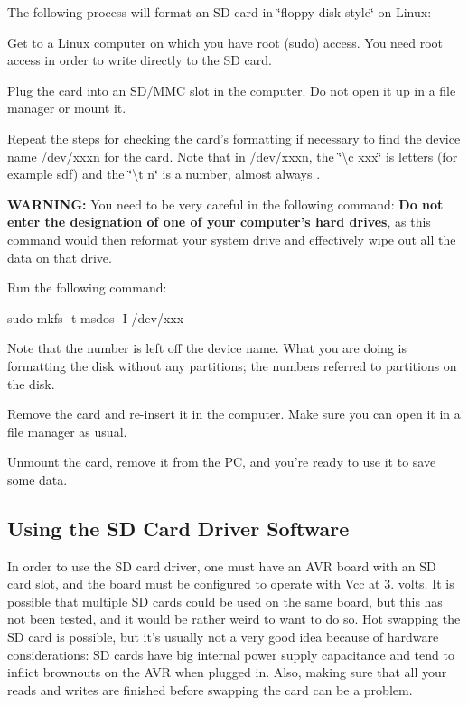 The following process will format an S\-D card in \char`\"{}floppy disk style\char`\"{} on Linux\-: \begin{DoxyItemize}
\item Get to a Linux computer on which you have root (sudo) access. You need root access in order to write directly to the S\-D card. \item Plug the card into an S\-D/\-M\-M\-C slot in the computer. Do not open it up in a file manager or mount it. \item Repeat the steps for checking the card's formatting if necessary to find the device name {\ttfamily /dev/xxxn} for the card. Note that in {\ttfamily /dev/xxxn}, the \char`\"{}\textbackslash{}c xxx\char`\"{} is letters (for example sdf) and the \char`\"{}\textbackslash{}t n\char`\"{} is a number, almost always {}. \item {\bfseries W\-A\-R\-N\-I\-N\-G\-:} You need to be very careful in the following command\-: {\bfseries Do not enter the designation of one of your computer's hard drives}, as this command would then reformat your system drive and effectively wipe out all the data on that drive. \item Run the following command\-: \par
 {\ttfamily sudo mkfs -\/t msdos -\/\-I /dev/xxx} \par
 Note that the number is left off the device name. What you are doing is formatting the disk without any partitions; the numbers referred to partitions on the disk. \item Remove the card and re-\/insert it in the computer. Make sure you can open it in a file manager as usual. \item Unmount the card, remove it from the P\-C, and you're ready to use it to save some data.\end{DoxyItemize}
\hypertarget{classsd__card_sd_card_drv}{}\subsection{Using the S\-D Card Driver Software}\label{classsd__card_sd_card_drv}
In order to use the S\-D card driver, one must have an A\-V\-R board with an S\-D card slot, and the board must be configured to operate with Vcc at 3. volts. It is possible that multiple S\-D cards could be used on the same board, but this has not been tested, and it would be rather weird to want to do so. Hot swapping the S\-D card is possible, but it's usually not a very good idea because of hardware considerations\-: S\-D cards have big internal power supply capacitance and tend to inflict brownouts on the A\-V\-R when plugged in. Also, making sure that all your reads and writes are finished before swapping the card can be a problem.

